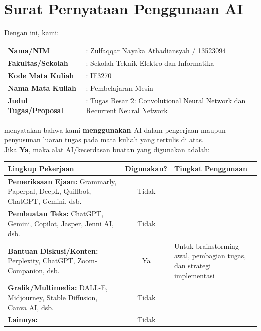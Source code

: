 \section{Surat Pernyataan Penggunaan AI}

Dengan ini, kami: \\[.5em]
    \begin{tabular}{ll}
        \textbf{Nama/NIM} & : Zulfaqqar Nayaka Athadiansyah / 13523094 \\
        \textbf{Fakultas/Sekolah} & : Sekolah Teknik Elektro dan Informatika \\
        \textbf{Kode Mata Kuliah} & : IF3270 \\
        \textbf{Nama Mata Kuliah} & : Pembelajaran Mesin \\
        \textbf{Judul Tugas/Proposal} & : Tugas Besar 2: Convolutional Neural Network dan Recurrent Neural Network \\
    \end{tabular}

\vspace{0.5cm}

\noindent menyatakan bahwa kami \textbf{menggunakan} AI dalam pengerjaan maupun penyusunan luaran tugas pada mata kuliah yang tertulis di atas. \\

\noindent Jika \textbf{Ya}, maka alat AI/kecerdasan buatan yang digunakan adalah:

\vspace{0.1cm}

\begin{table}[H]
    \centering
    \small
    \renewcommand{\arraystretch}{1.5}
    \begin{tabular}{|L{7cm}|c|L{4cm}|}
        \hline
        \textbf{Lingkup Pekerjaan} & \textbf{Digunakan?} & \textbf{Tingkat Penggunaan} \\ \hline
        \textbf{Pemeriksaan Ejaan:} Grammarly, Paperpal, DeepL, Quillbot, ChatGPT, Gemini, dsb. & Tidak & \\ \hline
        \textbf{Pembuatan Teks:} ChatGPT, Gemini, Copilot, Jasper, Jenni AI, dsb. & Tidak & \\ \hline
        \textbf{Bantuan Diskusi/Konten:} Perplexity, ChatGPT, Zoom-Companion, dsb. & Ya & Untuk brainstorming awal, pembagian tugas, dan strategi implementasi \\ \hline
        \textbf{Grafik/Multimedia:} DALL-E, Midjourney, Stable Diffusion, Canva AI, dsb. & Tidak & \\ \hline
        \textbf{Lainnya:} & Tidak & \\ \hline
    \end{tabular}
\end{table}

